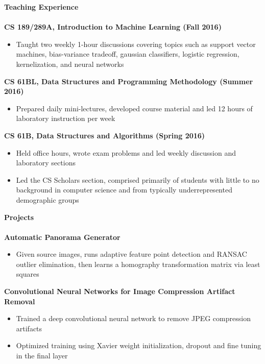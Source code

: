 \documentclass{article}
\begin{document}
\noindent
\textbf{{\Large Teaching Experience}}\\[-2mm]
\HRule\\
\textbf{CS 189/289A, Introduction to Machine Learning (Fall 2016)}
\begin{itemize}
\vspace{-1.8mm}
\item Taught two weekly 1-hour discussions covering topics such as support vector machines, bias-variance tradeoff, gaussian classifiers, logistic regression, kernelization, and neural networks
\end{itemize}
\textbf{CS 61BL, Data Structures and Programming Methodology (Summer 2016)}
\begin{itemize}
\vspace{-1.8mm}
\item Prepared daily mini-lectures, developed course material and led 12 hours of laboratory instruction per week
\end{itemize}
\textbf{CS 61B, Data Structures and Algorithms (Spring 2016)}
\begin{itemize}
\vspace{-1.8mm}
\item Held office hours, wrote exam problems and led weekly discussion and laboratory sections
\vspace{-2.5mm}
\item Led the CS Scholars section, comprised primarily of students with little to no background in computer science and from typically underrepresented demographic groups
\end{itemize}

\noindent
\textbf{\Large Projects}\\[-2mm]
\HRule\\
\textbf{Automatic Panorama Generator} 
\begin{itemize}
\vspace{-1.8mm}
\item Given source images, runs adaptive feature point detection and RANSAC outlier elimination, then learns a homography transformation matrix via least squares
\end{itemize}
\vspace{-1.8mm}
\noindent
\textbf{Convolutional Neural Networks for Image Compression Artifact Removal}
\begin{itemize}
\vspace{-1.8mm}
\item Trained a deep convolutional neural network to remove JPEG compression artifacts
\vspace{-2.5mm}
\item Optimized training using Xavier weight initialization, dropout and fine tuning in the final layer
\end{itemize}


\end{document}

